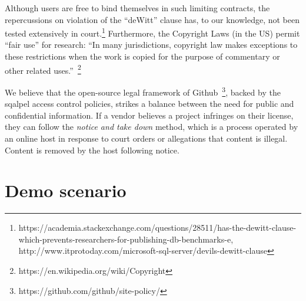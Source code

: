 \documentclass{cidr-2019}
\begin{document}
 Although users are free to bind themselves in such limiting
 contracts, the repercussions on violation of the ``deWitt'' clause
 has, to our knowledge, not been tested extensively in
 court.\footnote{https://academia.stackexchange.com/questions/28511/has-the-dewitt-clause-which-prevents-researchers-for-publishing-db-benchmarks-e,
   http://www.itprotoday.com/microsoft-sql-server/devils-dewitt-clause}
 Furthermore, the Copyright Laws (in the US) permit ``fair use'' for
 research: ``In many jurisdictions, copyright law makes exceptions to
 these restrictions when the work is copied for the purpose of
 commentary or other related
 uses.''~\footnote{https://en.wikipedia.org/wiki/Copyright}


We believe that the open-source legal framework of
Github~\footnote{https://github.com/github/site-policy/}, backed by
the {\sc sqalpel} access control policies, strikes a balance between
the need for public and confidential information. If a vendor believes
a project infringes on their license, they can follow the \emph{notice
  and take down} method, which is a process operated by an online host
in response to court orders or allegations that content is
illegal. Content is removed by the host following notice.



\section{Demo scenario}\label{demo}

 
 
\end{document}
